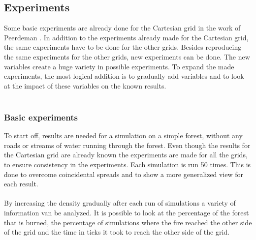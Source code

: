 \documentclass{article}
\begin{document}
\begin{multicols}{2}
\subsection*{Experiments}
Some basic experiments are already done for the Cartesian grid in the work of Peerdeman \cite{oldcode}. In addition to the experiments already made for the Cartesian grid, the same experiments have to be done for the other grids. Besides reproducing the same experiments for the other grids, new experiments can be done. The new variables create a huge variety in possible experiments. To expand the made experiments, the most logical addition is to gradually add variables and to look at the impact of these variables on the known results.\\\\

\subsubsection*{Basic experiments}
To start off, results are needed for a simulation on a simple forest, without any roads or streams of water running through the forest. Even though the results for the Cartesian grid are already known the experiments are made for all the grids, to ensure consistency in the experiments. Each simulation is run 50 times. This is done to overcome coincidental spreads and to show a more generalized view for each result.\\\\
By increasing the density gradually after each run of simulations a variety of information van be analyzed. It is possible to look at the percentage of the forest that is burned, the percentage of simulations where the fire reached the other side of the grid and the time in ticks it took to reach the other side of the grid.


\end{multicols}
\end{document}
